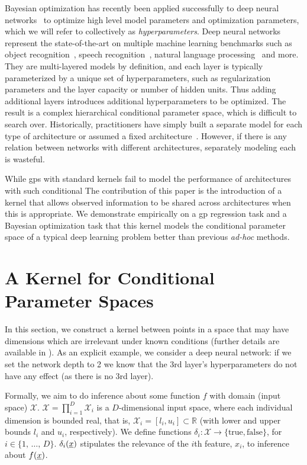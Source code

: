 \documentclass{article}
\newcommand{\vect}[1]{\underline{\smash{#1}}}
\renewcommand{\v}[1]{\vect{#1}}
\newcommand{\reals}{\mathds{R}}
\newcommand{\sX}{\mathcal{X}}
\newcommand{\gp}{{\sc gp}}
\begin{document}
Bayesian optimization has recently been applied successfully to deep neural networks~\cite{snoek-etal-2012b, BergstraJ2011} to optimize high level model parameters and optimization parameters, which we will refer to collectively as \emph{hyperparameters}.  Deep neural networks represent the state-of-the-art on multiple machine learning benchmarks such as object recognition~\cite{krizhevsky-2012}, speech recognition~\cite{deepSpeechReviewSPM2012}, natural language processing~\cite{mikolov2010recurrent} and more.
They are multi-layered models by definition, and each layer is typically parameterized by a unique set of hyperparameters, such as regularization parameters and the layer capacity or number of hidden units.  Thus adding additional layers introduces additional hyperparameters to be optimized.  The result is a complex hierarchical conditional parameter space, which is difficult to search over.  Historically, practitioners have simply built a separate model for each type of architecture \cite{bergstra2011algorithms} or assumed a fixed architecture~\cite{snoek-etal-2012b}.  However, if there is any relation between networks with different architectures, separately modeling each is wasteful. 

While \gp s with standard kernels fail to model the performance of architectures with such conditional %
The contribution of this paper is the introduction of a kernel that allows observed information to be shared across architectures when this is appropriate. We demonstrate empirically on a \gp{} regression task and a Bayesian optimization task that this kernel models the conditional parameter space of a typical deep learning problem better than previous \emph{ad-hoc} methods. 


\section{A Kernel for Conditional Parameter Spaces}
\vspace{-0.05in} 

In this section, we construct a kernel between points in a space that may have dimensions which are irrelevant under known conditions (further details are available in \cite{arxiv_hierarchical_kernel}). As an explicit example, we consider a deep neural network: if we set the network depth to 2 we know that the 3rd layer's hyperparameters do not have any effect (as there is no 3rd layer).

Formally, we aim to do inference about some function $f$ with domain (input space) $\sX$. $\sX = \prod_{i=1}^D \sX_i$ is a $D$-dimensional input space, where each individual dimension is bounded real, that is, $\sX_i = [l_i, u_i] \subset \reals$ (with lower and upper bounds $l_i$ and $u_i$, respectively). We define functions $\delta_i\colon \sX\to \{\text{true}, \text{false}\}$, for $i \in \{1,\,\ldots,\,D\}$. $\delta_i(\v{x})$ stipulates the relevance of the $i$th feature, $x_i$, to inference about $f(\v{x})$.
\end{document}
